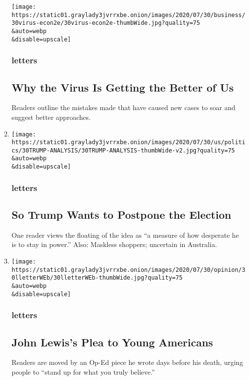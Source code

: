 \begin{enumerate}
  \texttt{[image: https://static01.graylady3jvrrxbe.onion/images/2020/07/30/business/30virus-econ2e/30virus-econ2e-thumbWide.jpg?quality=75\\\&auto=webp\\\&disable=upscale]}

  \hypertarget{letters-7}{%
  \subsubsection{letters}\label{letters-7}}

  \hypertarget{why-the-virus-is-getting-the-better-of-us}{%
  \subsection{Why the Virus Is Getting the Better of
  Us}\label{why-the-virus-is-getting-the-better-of-us}}

  Readers outline the mistakes made that have caused new cases to soar
  and suggest better approaches.
\item
  \href{/2020/07/31/opinion/letters/trump-election.html}{}

  \texttt{[image: https://static01.graylady3jvrrxbe.onion/images/2020/07/30/us/politics/30TRUMP-ANALYSIS/30TRUMP-ANALYSIS-thumbWide-v2.jpg?quality=75\\\&auto=webp\\\&disable=upscale]}

  \hypertarget{letters-8}{%
  \subsubsection{letters}\label{letters-8}}

  \hypertarget{so-trump-wants-to-postpone-the-election}{%
  \subsection{So Trump Wants to Postpone the
  Election}\label{so-trump-wants-to-postpone-the-election}}

  One reader views the floating of the idea as ``a measure of how
  desperate he is to stay in power.'' Also: Maskless shoppers; uncertain
  in Australia.
\item
  \href{/2020/07/30/opinion/letters/john-lewis-civil-rights.html}{}

  \texttt{[image: https://static01.graylady3jvrrxbe.onion/images/2020/07/30/opinion/30lletterWEb/30lletterWEb-thumbWide.jpg?quality=75\\\&auto=webp\\\&disable=upscale]}

  \hypertarget{letters-9}{%
  \subsubsection{letters}\label{letters-9}}

  \hypertarget{john-lewiss-plea-to-young-americans}{%
  \subsection{John Lewis's Plea to Young
  Americans}\label{john-lewiss-plea-to-young-americans}}

  Readers are moved by an Op-Ed piece he wrote days before his death,
  urging people to ``stand up for what you truly believe.''
\end{enumerate}

